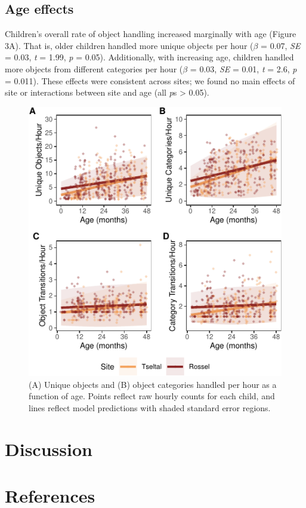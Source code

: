 \documentclass[10pt, letterpaper]{article}
\newenvironment{CodeChunk}{}{}
\begin{document}
\hypertarget{age-effects}{%
\subsection{Age effects}\label{age-effects}}

Children's overall rate of object handling increased marginally with age
(Figure 3A). That is, older children handled more unique objects per
hour (\(\beta\) = 0.07, \emph{SE} = 0.03, \emph{t} = 1.99, \emph{p} =
0.05). Additionally, with increasing age, children handled more objects
from different categories per hour (\(\beta\) = 0.03, \emph{SE} = 0.01,
\emph{t} = 2.6, \emph{p} = 0.011). These effects were consistent across
sites; we found no main effects of site or interactions between site and
age (all \emph{p}s \textgreater{} 0.05).

\begin{CodeChunk}
\begin{figure}[!ht]

{\centering \includegraphics{figs/age-effects-fig-1} 

}

\caption[(A) Unique objects and (B) object categories handled per hour as a function of age]{(A) Unique objects and (B) object categories handled per hour as a function of age. Points reflect raw hourly counts for each child, and lines reflect model predictions with shaded standard error regions.}\label{fig:age-effects-fig}
\end{figure}
\end{CodeChunk}

\hypertarget{discussion}{%
\section{Discussion}\label{discussion}}

\hypertarget{references}{%
\section{References}\label{references}}

\setlength{\parindent}{-0.1in} 
\setlength{\leftskip}{0.125in}

\noindent


\end{document}
